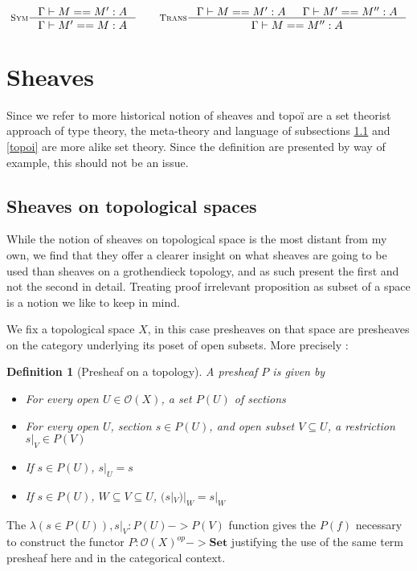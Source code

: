 \documentclass[11pt]{article}
\newtheorem{definition}[theorem]{Definition}
\newcommand{\0}{\mathbf{0}}
\newcommand{\1}{\mathbf{1}}
\newcommand{\tctx}{\Gamma}
\begin{document}
$$
    \inference[\textsc{Sym}]{\tctx |- M == M' : A}{\tctx |- M' == M : A} \qquad
    \inference[\textsc{Trans}]
    {\tctx |- M == M' :A & \tctx |- M' == M'' : A}{\tctx |- M == M'' : A}
$$

\section{Sheaves}\label{Sheaves}

Since we refer to more historical notion of sheaves and topoï are a set theorist approach of type theory, the meta-theory and language of subsections \ref{topsheaves} and \ref{topoi} are more alike set theory.
Since the definition are presented by way of example, this should not be an issue.

\subsection{Sheaves on topological spaces}\label{topsheaves}

While the notion of sheaves on topological space is the most distant from my own, we find that they offer a clearer insight on what sheaves are going to be used than sheaves on a grothendieck topology, and as such present the first and not the second in detail.
Treating proof irrelevant proposition as subset of a space is a notion we like to keep in mind.

We fix a topological space $X$, in this case presheaves on that space are presheaves on the category underlying its poset of open subsets. More precisely :

\begin{definition}[Presheaf on a topology]
    A \emph{presheaf} $P$ is given by
    \begin{itemize}
        \item For every open $U \in \mathcal{O}(X)$, a set $P(U)$ of \emph{sections}
        \item For every open $U$, section $s\in P(U)$, and open subset $V\subseteq U$, a \emph{restriction} $s|_V\in P(V)$
        \item If $s\in P(U)$, $s|_U = s$
        \item If $s\in P(U)$, $W\subseteq V \subseteq U$, $(s|_V)|_W = s|_W$
    \end{itemize}
\end{definition}
The $\lambda (s\in P(U)), s|_V : P(U) -> P(V)$ function gives the $P(f)$ necessary to construct the functor $P : \mathcal{O}(X)^{op} -> \mathbf{Set}$ justifying the use of the same term presheaf here and in the categorical context.
\end{document}
